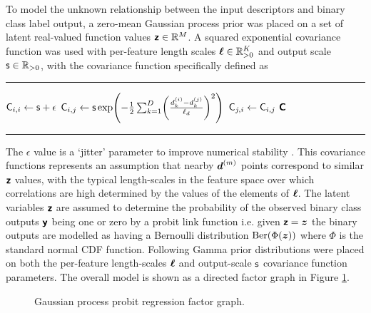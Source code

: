 To model the unknown relationship between the input descriptors and binary class label output, a zero-mean Gaussian process prior \citep{rasmussen2006gaussian} was placed on a set of latent real-valued function values $\boldsymbol{\mathsf{z}} \in \mathbb{R}^M$. A squared exponential covariance function was used with per-feature length scales $\boldsymbol{\mathsf{\ell}} \in \mathbb{R}_{>0}^K$ and output scale $\mathsf{s} \in \mathbb{R}_{>0}$, with the covariance function specifically defined as
{
\vspace{2mm}
\hrule
\small
\vspace{1mm}
\begin{algorithmic}
      \State $\mathsf{C}_{i,i} \gets \mathsf{s} + \epsilon$
        \State $\rvar{C}_{i,j} \gets \rvar{s} \exp\lpa -\frac{1}{2} \sum_{k=1}^D \lpa \frac{d_k^{(i)} - d_k^{(j)}}{\rvar{\ell}_d} \rpa^2 \rpa$
        \State $\mathsf{C}_{j,i} \gets \mathsf{C}_{i,j}$
      \EndFor
    \EndFor
    \State\Return $\boldsymbol{\mathsf{C}}$
  \EndFunction
\end{algorithmic}
\vspace{2mm}
\hrule
\vspace{1mm}
}
The $\epsilon$ value is a `jitter' parameter to improve numerical stability \citep{rasmussen2006gaussian}. This covariance functions represents an assumption that nearby $\boldsymbol{d}^{(m)}$ points correspond to similar $\boldsymbol{\mathsf{z}}$ values, with the typical length-scales in the feature space over which correlations are high determined by the values of the elements of $\boldsymbol{\mathsf{\ell}}$. The latent variables $\boldsymbol{\mathsf{z}}$ are assumed to determine the probability of the observed binary class outputs $\boldsymbol{\mathsf{y}}$ being one or zero by a probit link function i.e. given $\boldsymbol{\mathsf{z}}=\boldsymbol{z}$ the binary outputs are modelled as having a Bernoulli distribution $\textrm{Ber}(\Phi(\boldsymbol{z}))$ where $\Phi$ is the standard normal \ac{CDF} function. Following \citep{filippone2014pseudo} Gamma prior distributions were placed on both the per-feature length-scales $\boldsymbol{\mathsf{\ell}}$ and output-scale $\mathsf{s}$ covariance function parameters. The overall model is shown as a directed factor graph in Figure \ref{fig:gaussian-process-probit-regression-factor-graph}.

\begin{figure}[!t]
\centering
{}
\caption{Gaussian process probit regression factor graph.}
\label{fig:gaussian-process-probit-regression-factor-graph}
\end{figure}

